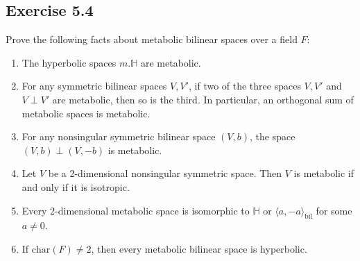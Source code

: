 \documentclass[12pt, a4paper]{article}
\begin{document}
\subsection*{Exercise 5.4}
 Prove the following facts about metabolic bilinear spaces over a field $F$:
\begin{enumerate}
    \item The hyperbolic spaces $m.\mathbb{H}$ are metabolic.
    \item For any symmetric bilinear spaces $V, V'$, if two of the three spaces $V, V'$ and $V \perp V'$ are metabolic, then so is the third. In particular, an orthogonal sum of metabolic spaces is metabolic.
    \item For any nonsingular symmetric bilinear space $(V, b)$, the space $(V, b) \perp (V, -b)$ is metabolic.
    \item Let $V$ be a 2-dimensional nonsingular symmetric space. Then $V$ is metabolic if and only if it is isotropic.
    \item Every 2-dimensional metabolic space is isomorphic to $\mathbb{H}$ or $\langle a, -a \rangle_{\mathrm{bil}}$ for some $a \neq 0$.
    \item If $\mathrm{char}(F) \neq 2$, then every metabolic bilinear space is hyperbolic.
\end{enumerate}
\end{document}
